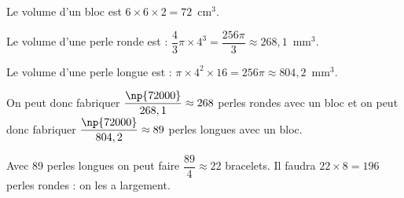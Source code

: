 Le volume d’un bloc est $6 \times 6 \times 2 = 72$~cm$^3$.

Le volume d’une perle ronde est : $\dfrac{4}{3}\pi \times 4^3 = \dfrac{256\pi}{3} \approx 268,1$~mm$^3$.

Le volume d’une perle longue est : $\pi \times 4^2 \times 16 = 256\pi \approx 804,2$~mm$^3$.

On peut donc fabriquer $\dfrac{\np{72000}}{268,1} \approx 268$ perles rondes avec un bloc et on peut donc fabriquer $\dfrac{\np{72000}}{804,2} \approx 89$ perles longues avec un bloc.

Avec 89 perles longues on peut faire $\dfrac{89}{4} \approx 22$ bracelets. Il faudra $22 \times 8 = 196$ perles rondes  : on les a largement.

